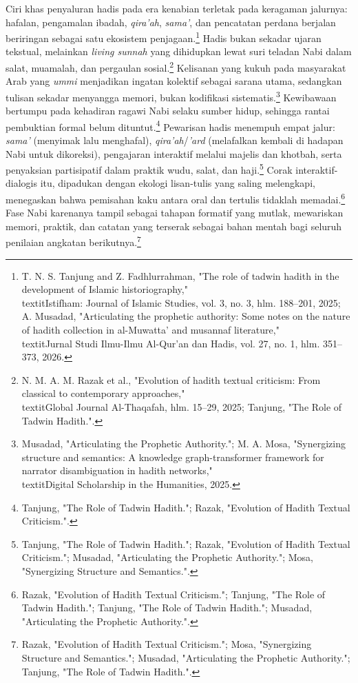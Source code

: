 Ciri khas penyaluran hadis pada era kenabian terletak pada keragaman jalurnya: hafalan, pengamalan ibadah, \textit{qira'ah}, \textit{sama'}, dan pencatatan perdana berjalan beriringan sebagai satu ekosistem penjagaan.\footnote{T. N. S. Tanjung and Z. Fadhlurrahman, "The role of tadwin hadith in the development of Islamic historiography," \\textit{Istifham: Journal of Islamic Studies}, vol. 3, no. 3, hlm. 188--201, 2025; A. Musadad, "Articulating the prophetic authority: Some notes on the nature of hadith collection in al-Muwatta' and musannaf literature," \\textit{Jurnal Studi Ilmu-Ilmu Al-Qur'an dan Hadis}, vol. 27, no. 1, hlm. 351--373, 2026.} Hadis bukan sekadar ujaran tekstual, melainkan \textit{living sunnah} yang dihidupkan lewat suri teladan Nabi dalam salat, muamalah, dan pergaulan sosial.\footnote{N. M. A. M. Razak et al., "Evolution of hadith textual criticism: From classical to contemporary approaches," \\textit{Global Journal Al-Thaqafah}, hlm. 15--29, 2025; Tanjung, "The Role of Tadwin Hadith.".} Kelisanan yang kukuh pada masyarakat Arab yang \textit{ummi} menjadikan ingatan kolektif sebagai sarana utama, sedangkan tulisan sekadar menyangga memori, bukan kodifikasi sistematis.\footnote{Musadad, "Articulating the Prophetic Authority."; M. A. Mosa, "Synergizing structure and semantics: A knowledge graph-transformer framework for narrator disambiguation in hadith networks," \\textit{Digital Scholarship in the Humanities}, 2025.} Kewibawaan bertumpu pada kehadiran ragawi Nabi selaku sumber hidup, sehingga rantai pembuktian formal belum dituntut.\footnote{Tanjung, "The Role of Tadwin Hadith."; Razak, "Evolution of Hadith Textual Criticism.".} Pewarisan hadis menempuh empat jalur: \textit{sama'} (menyimak lalu menghafal), \textit{qira'ah}/\textit{'ard} (melafalkan kembali di hadapan Nabi untuk dikoreksi), pengajaran interaktif melalui majelis dan khotbah, serta penyaksian partisipatif dalam praktik wudu, salat, dan haji.\footnote{Tanjung, "The Role of Tadwin Hadith."; Razak, "Evolution of Hadith Textual Criticism."; Musadad, "Articulating the Prophetic Authority."; Mosa, "Synergizing Structure and Semantics.".} Corak interaktif-dialogis itu, dipadukan dengan ekologi lisan-tulis yang saling melengkapi, menegaskan bahwa pemisahan kaku antara oral dan tertulis tidaklah memadai.\footnote{Razak, "Evolution of Hadith Textual Criticism."; Tanjung, "The Role of Tadwin Hadith."; Tanjung, "The Role of Tadwin Hadith."; Musadad, "Articulating the Prophetic Authority.".} Fase Nabi karenanya tampil sebagai tahapan formatif yang mutlak, mewariskan memori, praktik, dan catatan yang terserak sebagai bahan mentah bagi seluruh penilaian angkatan berikutnya.\footnote{Razak, "Evolution of Hadith Textual Criticism."; Mosa, "Synergizing Structure and Semantics."; Musadad, "Articulating the Prophetic Authority."; Tanjung, "The Role of Tadwin Hadith.".}

